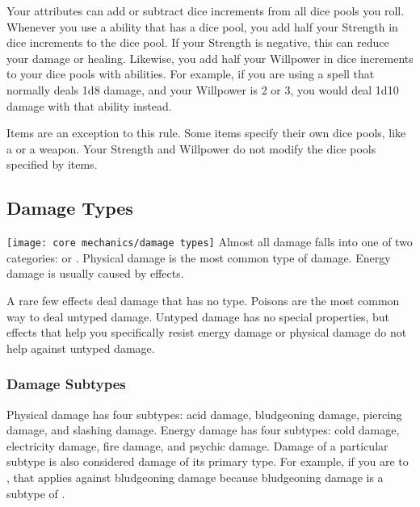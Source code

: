            \label{Dice Bonuses From Attributes} Your attributes can add or subtract dice increments from all dice pools you roll.
            Whenever you use a  ability that has a dice pool, you add half your Strength in dice increments to the dice pool.
            If your Strength is negative, this can reduce your damage or healing.
            Likewise, you add half your Willpower in dice increments to your dice pools with \magical abilities.
            For example, if you are using a spell that normally deals 1d8 damage, and your Willpower is 2 or 3, you would deal 1d10 damage with that ability instead.

            Items are an exception to this rule.
            Some items specify their own dice pools, like a  or a  weapon.
            Your Strength and Willpower do not modify the dice pools specified by items.

    \subsection{Damage Types}\label{Damage Types}
        \texttt{[image: core mechanics/damage types]}
        Almost all damage falls into one of two categories:  or .
        Physical damage is the most common type of damage.
        Energy damage is usually caused by \magical effects.

        A rare few effects deal damage that has no type.
        Poisons are the most common way to deal untyped damage.
        Untyped damage has no special properties, but effects that help you specifically resist energy damage or physical damage do not help against untyped damage.

        \subsubsection{Damage Subtypes}\label{Damage Subtypes}
            Physical damage has four subtypes: acid damage, bludgeoning damage, piercing damage, and slashing damage.
            Energy damage has four subtypes: cold damage, electricity damage, fire damage, and psychic damage.
            Damage of a particular subtype is also considered damage of its primary type.
            For example, if you are  to , that applies against bludgeoning damage because bludgeoning damage is a subtype of .

